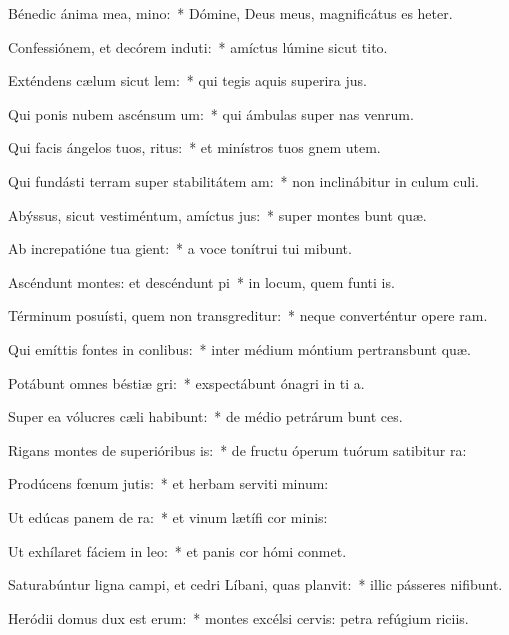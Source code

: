 \item Bénedic ánima mea, mino:~* Dómine, Deus meus, magnificátus es heter.
\item Confessiónem, et decórem induti:~* amíctus lúmine sicut tito.
\item Exténdens cælum sicut lem:~* qui tegis aquis superira jus.
\item Qui ponis nubem ascénsum um:~* qui ámbulas super nas venrum.
\item Qui facis ángelos tuos, ritus:~* et minístros tuos gnem utem.
\item Qui fundásti terram super stabilitátem am:~* non inclinábitur in culum culi.
\item Abýssus, sicut vestiméntum, amíctus jus:~* super montes bunt quæ.
\item Ab increpatióne tua gient:~* a voce tonítrui tui mibunt.
\item Ascéndunt montes: et descéndunt pi~* in locum, quem funti is.
\item Términum posuísti, quem non transgreditur:~* neque converténtur opere ram.
\item Qui emíttis fontes in conlibus:~* inter médium móntium pertransbunt quæ.
\item Potábunt omnes béstiæ gri:~* exspectábunt ónagri in ti a.
\item Super ea vólucres cæli habibunt:~* de médio petrárum bunt ces.
\item Rigans montes de superióribus is:~* de fructu óperum tuórum satibitur ra:
\item Prodúcens fœnum jutis:~* et herbam serviti minum:
\item Ut edúcas panem de ra:~* et vinum lætífi cor minis:
\item Ut exhílaret fáciem in leo:~* et panis cor hómi conmet.
\item Saturabúntur ligna campi, et cedri Líbani, quas planvit:~* illic pásseres nifibunt.
\item Heródii domus dux est erum:~* montes excélsi cervis: petra refúgium riciis.
